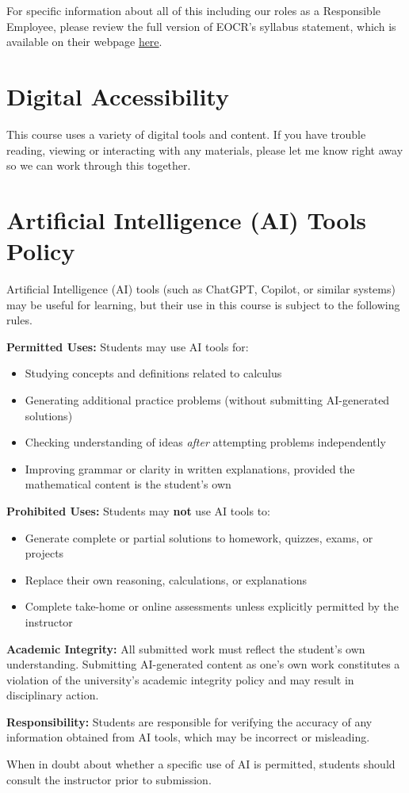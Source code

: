\documentclass[12pt]{article}
\begin{document}
        For specific information about all of this including our roles as a Responsible Employee, please review the full version of EOCR's syllabus statement, which is available on their webpage \href{https://eocr.virginia.edu/syllabus}{here}.

\section{Digital Accessibility}
 This course uses a variety of digital tools and content. If you have trouble reading, viewing or interacting with any materials, please let me know right away so we can work through this together.
\section{Artificial Intelligence (AI) Tools Policy}

Artificial Intelligence (AI) tools (such as ChatGPT, Copilot, or similar systems) may be useful for learning, but their use in this course is subject to the following rules.

\textbf{Permitted Uses:} Students may use AI tools for:
\begin{itemize}
    \item Studying concepts and definitions related to calculus
    \item Generating additional practice problems (without submitting AI-generated solutions)
    \item Checking understanding of ideas \emph{after} attempting problems independently
    \item Improving grammar or clarity in written explanations, provided the mathematical content is the student’s own
\end{itemize}

\textbf{Prohibited Uses:} Students may \textbf{not} use AI tools to:
\begin{itemize}
    \item Generate complete or partial solutions to homework, quizzes, exams, or projects
    \item Replace their own reasoning, calculations, or explanations
    \item Complete take-home or online assessments unless explicitly permitted by the instructor
\end{itemize}

\textbf{Academic Integrity:} All submitted work must reflect the student’s own understanding. Submitting AI-generated content as one’s own work constitutes a violation of the university’s academic integrity policy and may result in disciplinary action.

\textbf{Responsibility:} Students are responsible for verifying the accuracy of any information obtained from AI tools, which may be incorrect or misleading.

When in doubt about whether a specific use of AI is permitted, students should consult the instructor prior to submission.
\end{document}
